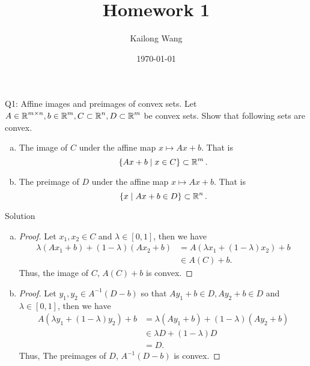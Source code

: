 \documentclass{article}
\title{Homework 1}
\author{Kailong Wang}
\date{\today}
\begin{document}
\maketitle
\begin{problem}
    {Q1: Affine images and preimages of convex sets.}
    Let $A\in \operatorname{\mathbb{R}}^{m\times n}, b\in\operatorname{\mathbb{R}}^m, C\subset\operatorname{\mathbb{R}}^n, D\subset\operatorname{\mathbb{R}}^m$ be convex sets. Show that following sets are convex.
    \begin{enumerate}[(a)]
        \item The image of $C$ under the affine map $x\mapsto Ax+b$. That is {
            \[
                \{Ax+b\mid x\in C\}\subset\operatorname{\mathbb{R}}^m.
            \]
        }
        \item The preimage of $D$ under the affine map $x\mapsto Ax+b$. That is {
            \[
                \{x\mid Ax+b\in D\}\subset\operatorname{\mathbb{R}}^n.
            \]
        }
    \end{enumerate}
\end{problem}

\begin{solution}
    {Solution}
    \begin{enumerate}[(a)]
        \item  {
            \begin{proof}
                Let $x_1,x_2\in C$ and $\lambda\in[0,1]$, then we have {
                \begin{align*}
                    \lambda(Ax_1+b)+(1-\lambda)(Ax_2+b) &= A(\lambda x_1+(1-\lambda)x_2)+b\\
                    &\in A(C)+b.
                \end{align*}
                }
            Thus, the image of $C$, $A(C)+b$ is convex.
            \end{proof}
        }
        \item {
            \begin{proof}
                Let $y_1,y_2\in A^{-1}(D-b)$ so that $Ay_1+b\in D, Ay_2+b\in D$ and $\lambda\in[0,1]$, then we have {
                \begin{align*}
                    A(\lambda y_1+(1-\lambda)y_2)+b &= \lambda(Ay_1+b)+(1-\lambda)(Ay_2+b)\\
                    &\in \lambda D+(1-\lambda)D\\
                    &= D.
                \end{align*}
            }
            Thus, The preimages of $D$, $A^{-1}(D-b)$ is convex.
            \end{proof}
        }
    \end{enumerate}
\end{solution}
\end{document}

